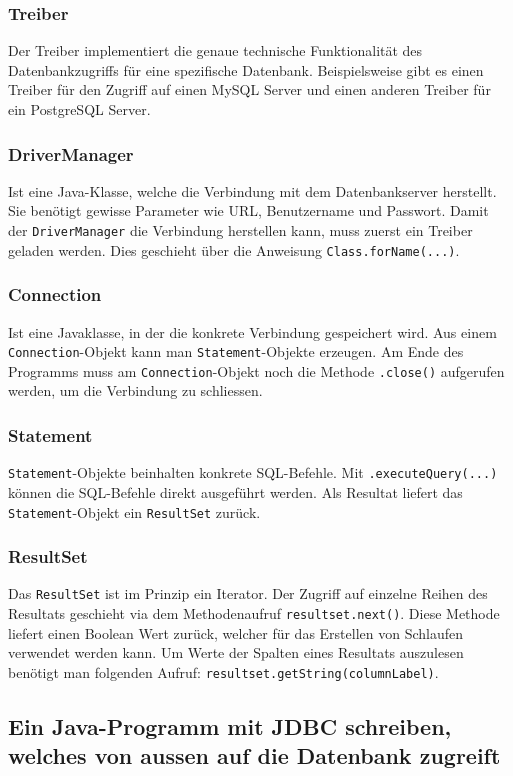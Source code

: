 \subsubsection{Treiber}
Der Treiber implementiert die genaue technische Funktionalität des Datenbankzugriffs für eine spezifische Datenbank. Beispielsweise gibt es einen Treiber für den Zugriff auf einen MySQL Server und einen anderen Treiber für ein PostgreSQL Server.

\subsubsection{DriverManager}
Ist eine Java-Klasse, welche die Verbindung mit dem Datenbankserver herstellt. Sie benötigt gewisse Parameter wie URL, Benutzername und Passwort. Damit der \texttt{DriverManager} die Verbindung herstellen kann, muss zuerst ein Treiber geladen werden. Dies geschieht über die Anweisung \texttt{Class.forName(...)}.

\subsubsection{Connection}
Ist eine Javaklasse, in der die konkrete Verbindung gespeichert wird. Aus einem \verb|Connection|-Objekt kann man \verb|Statement|-Objekte erzeugen. Am Ende des Programms muss am \verb|Connection|-Objekt noch die Methode \verb|.close()| aufgerufen werden, um die Verbindung zu schliessen.

\subsubsection{Statement}
\verb|Statement|-Objekte beinhalten konkrete SQL-Befehle. Mit \verb|.executeQuery(...)| können die SQL-Befehle direkt ausgeführt werden. Als Resultat liefert das \verb|Statement|-Objekt ein \verb|ResultSet| zurück.

\subsubsection{ResultSet}
Das \texttt{ResultSet} ist im Prinzip ein Iterator. Der Zugriff auf einzelne Reihen des Resultats geschieht via dem Methodenaufruf \verb|resultset.next()|. Diese Methode liefert einen Boolean Wert zurück, welcher für das Erstellen von Schlaufen verwendet werden kann. Um Werte der Spalten eines Resultats auszulesen benötigt man folgenden Aufruf: \verb|resultset.getString(columnLabel)|. 

\subsection{Ein Java-Programm mit JDBC schreiben, welches von aussen auf die Datenbank zugreift}

